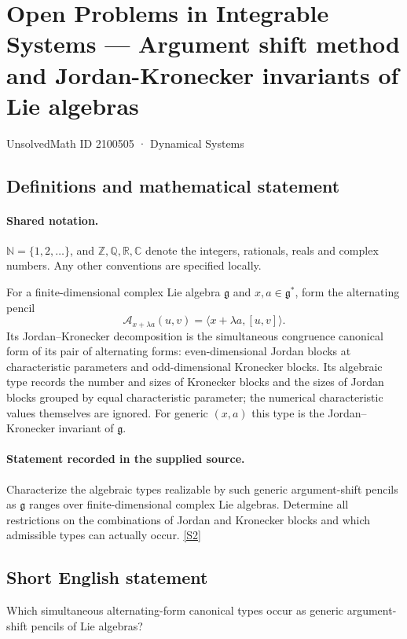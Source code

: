 \documentclass[11pt]{article}
\newcommand{\sref}[2]{\hyperlink{source:#1:#2}{[S#2]}}
\begin{document}
\setcounter{section}{2100504}
\section{Open Problems in Integrable Systems — Argument shift method and Jordan-Kronecker invariants of Lie algebras}\label{2100505}
{\small\sffamily UnsolvedMath ID 2100505 · Dynamical Systems}
\subsection{Definitions and mathematical statement}

\paragraph{Shared notation.}$\mathbb N=\{1,2,\ldots\}$, and $\mathbb Z,\mathbb Q,\mathbb R,\mathbb C$ denote the integers, rationals, reals and complex numbers. Any other conventions are specified locally.


For a finite-dimensional complex Lie algebra $\mathfrak g$ and $x,a\in\mathfrak g^*$, form the alternating pencil \[\mathcal A_{x+\lambda a}(u,v)=\langle x+\lambda a,[u,v]\rangle.\] Its Jordan--Kronecker decomposition is the simultaneous congruence canonical form of its pair of alternating forms: even-dimensional Jordan blocks at characteristic parameters and odd-dimensional Kronecker blocks. Its algebraic type records the number and sizes of Kronecker blocks and the sizes of Jordan blocks grouped by equal characteristic parameter; the numerical characteristic values themselves are ignored. For generic $(x,a)$ this type is the Jordan--Kronecker invariant of $\mathfrak g$.
\paragraph{Statement recorded in the supplied source.}
Characterize the algebraic types realizable by such generic argument-shift pencils as $\mathfrak g$ ranges over finite-dimensional complex Lie algebras. Determine all restrictions on the combinations of Jordan and Kronecker blocks and which admissible types can actually occur. \sref{2100505}{2}
\subsection{Short English statement}
Which simultaneous alternating-form canonical types occur as generic argument-shift pencils of Lie algebras?
\end{document}
